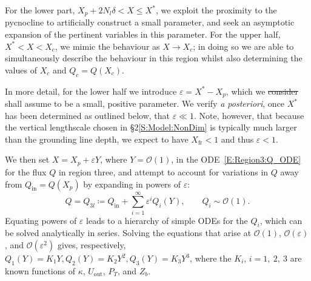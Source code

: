 \documentclass[openacc]{rsproca_new}%
\newcommand{\order}[1]{\mathcal{O}(#1)}
\newcommand{\red}[1]{{\color{red} #1}}
\newcommand{\blue}[1]{{\color{blue} #1}}
\newcommand{\rout}[1]{\red{\st{#1}}}\newcommand{\ab}[1]{\textcolor{Green}{#1}}\newcommand{\about}[1]{\textcolor{Cyan}{\sout{#1}}}
\newcommand{\lt}{\delta} %
\newcommand{\Pt}{\textit{P}_T}
\renewcommand{\in}{\text{in}} %
\newcommand{\out}{\text{out}}
\begin{document}
For the lower part, $X_p  + 2N_l \lt < X \leq X^*$, we exploit the proximity to the pycnocline to artificially construct a small parameter, and seek an asymptotic expansion of the pertinent variables in this parameter. For the upper half, $X^* < X < X_c$, we mimic the behaviour as $X \to X_c$; in doing so we are able to simultaneously describe the behaviour in this region whilst also determining the values of $X_c$ and $Q_c = Q(X_c)$.

In more detail, for the lower half we introduce $\varepsilon = X^* - X_p$,
which we \rout{consider} \blue{shall assume} to be a small, positive parameter. \blue{We verify \textit{a posteriori}, once $X^*$ has been determined as outlined below, that $\varepsilon \ll 1$. Note, however, that because the vertical lengthscale chosen in \S2\ref{S:Model:NonDim} is typically much larger than the grounding line depth, we expect to have $X_{\text{fr}} < 1$ and thus $\varepsilon < 1$. } 

We then set $X = X_p + \varepsilon Y$, where  $Y = \order{1}$, in the ODE~\eqref{E:Region3:Q_ODE} for the flux $Q$ in region three, and attempt to account for variations in $Q$ away from $Q_{\text{in}} = Q(X_p)$ by expanding in powers of $\varepsilon$:
\begin{equation}\label{E:MeltRate:Q_expansionR3}
Q = Q_{3l} \coloneqq   Q_\in  + \sum_{i = 1}^{\infty} \varepsilon^i Q_i(Y), \qquad Q_i \sim \order{1}.
 \end{equation}
Equating powers of $\varepsilon$ leads to a hierarchy of simple ODEs for the $Q_i$, which can be solved analytically in series. Solving the equations that arise at $\order{1}$, $\order{\varepsilon}$, and $\order{\varepsilon^2}$ gives, respectively, $
Q_1(Y) = K_1 Y,  Q_2(Y) = K_2 Y^2,  Q_3(Y) =K_3 Y^3$, where the $K_i$, $i = 1,~2,~3$ are known functions of $\kappa$, $U_{\text{out}}$, $P_T$, and $Z_b$.

\end{document}
